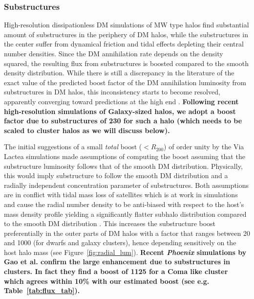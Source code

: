 \documentclass[10pt,aps,pra,reprint,amsmath,amsfonts,amssymb,showpacs,nofootinbib,floatfix]{revtex4-1}
\def\C#1{{\bf #1}}
\begin{document}
\subsubsection{Substructures}
\label{sect:subst}
High-resolution dissipationless DM simulations of MW type halos find
substantial amount of substructures in the periphery of DM halos,
while the substructures in the center suffer from dynamical friction
and tidal effects depleting their central number densities. Since the
DM annihilation rate depends on the density squared, the resulting
flux from substructures is boosted compared to the smooth density
distribution.  While there is still a discrepancy in the literature of
the exact value of the predicted boost factor of the DM annihilation
luminosity from substructures in DM halos, this inconsistency starts
to become resolved, apparently converging toward predictions at the
high end \protect \cite{2008MNRAS.391.1685S, 2008Natur.456...73S,
  2010ApJ...718..899A}. \C{Following recent high-resolution
  simulations of Galaxy-sized halos, we adopt a boost factor due to
  substructures of 230 for such a halo \cite{2008MNRAS.391.1685S}
  (which needs to be scaled to cluster halos as we will discuss
  below).}

The initial suggestions of a small {\em total} boost ($<R_{200}$) of
order unity by the Via Lactea simulations \cite{2008JPhCS.125a2008K}
made assumptions of computing the boost assuming that the substructure
luminosity follows that of the smooth DM distribution. Physically,
this would imply substructure to follow the smooth DM distribution and
a radially independent concentration parameter of substructures. Both
assumptions are in conflict with tidal mass loss of satellites which
is at work in simulations and cause the radial number density to be
anti-biased with respect to the host's mass density profile yielding a
significantly flatter subhalo distribution compared to the smooth DM
distribution \cite{2010ApJ...718..899A}.  This increases the
substructure boost preferentially in the outer parts of DM halos with
a factor that ranges between 20 and 1000 (for dwarfs and galaxy
clusters), hence depending sensitively on the host halo mass (see
Figure~\ref{fig:radial_lum}). \C{Recent {\it Phoenix} simulations by
  Gao et al. \cite{2011arXiv1107.1916G} confirm the large enhancement
  due to substructures in clusters. In fact they find a boost of 1125
  for a Coma like cluster which agrees within 10\% with our estimated
  boost (see e.g. Table~\ref{tab:flux_tab}).}
\end{document}
